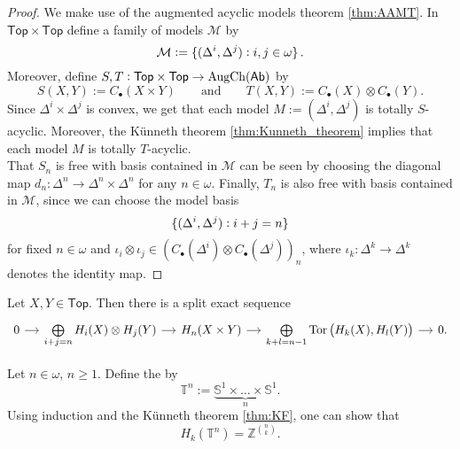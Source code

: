 \begin{proof}
	We make use of the augmented acyclic models theorem \ref{thm:AAMT}. In $\mathsf{Top} \times \mathsf{Top}$ define a family of models $\mathcal{M}$ by
	\begin{equation*}
		\mathcal{M} := \cbr[0]{(\Delta^i,\Delta^j) : i,j \in \omega}.
	\end{equation*}
	Moreover, define $S,T : \mathsf{Top} \times \mathsf{Top} \to \operatorname{AugCh}(\mathsf{Ab})$ by
	\begin{equation*}
		S(X,Y) := C_\bullet(X \times Y) \qquad \text{and} \qquad T(X,Y) := C_\bullet(X) \otimes C_\bullet(Y).
	\end{equation*}
	Since $\Delta^i \times \Delta^j$ is convex, we get that each model $M := (\Delta^i,\Delta^j)$ is totally $S$-acyclic. Moreover, the K\"unneth theorem \ref{thm:Kunneth_theorem} implies that each model $M$ is totally $T$-acyclic.\\
	That $S_n$ is free with basis contained in $\mathcal{M}$ can be seen by choosing the diagonal map $d_n : \Delta^n \to \Delta^n \times \Delta^n$ for any $n \in \omega$. Finally, $T_n$ is also free with basis contained in $\mathcal{M}$, since we can choose the model basis 
	\begin{equation*}
		\cbr[0]{(\Delta^i,\Delta^j) : i + j = n}
	\end{equation*}
	\noindent for fixed $n \in \omega$ and $\iota_i \otimes \iota_j \in (C_\bullet(\Delta^i) \otimes C_\bullet(\Delta^j))_n$, where $\iota_k : \Delta^k \to \Delta^k$ denotes the identity map.
\end{proof}

\begin{corollary}
	\label{thm:KF}
	Let $X,Y \in \mathsf{Top}$. Then there is a split exact sequence
	\begin{equation*}
		\begin{tikzcd}[column sep=small]
			0 \arrow[r] & \bigoplus\limits_{i + j = n} H_i(X) \otimes H_j(Y) \arrow[r] & H_n(X \times Y) \arrow[r] & \bigoplus\limits_{k + l = n - 1} \Tor\del[1]{H_k(X),H_l(Y)} \arrow[r] & 0.
		\end{tikzcd}
	\end{equation*}
\end{corollary}

\begin{example}
	\label{ex:ntorus}
	Let $n \in \omega$, $n \geq 1$. Define the  by
	\begin{equation*}
		\mathbb{T}^n := \underbrace{\mathbb{S}^1 \times \dots \times \mathbb{S}^1}_{n}.
	\end{equation*}
	Using induction and the Künneth theorem \ref{thm:KF}, one can show that
	\begin{equation*}
		H_k(\mathbb{T}^n) = \mathbb{Z}^{n \choose k}.
	\end{equation*}
\end{example}

